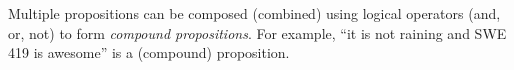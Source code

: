 \documentclass[oneside,11pt,dvipsnames]{book}
\renewcommand{\implies}{\Rightarrow}
\begin{document}
Multiple propositions can be composed (combined) using logical operators (and, or, not) to form \emph{compound propositions}. For example, ``it is not raining and SWE 419 is awesome'' is a (compound) proposition. 




            
\end{document}
